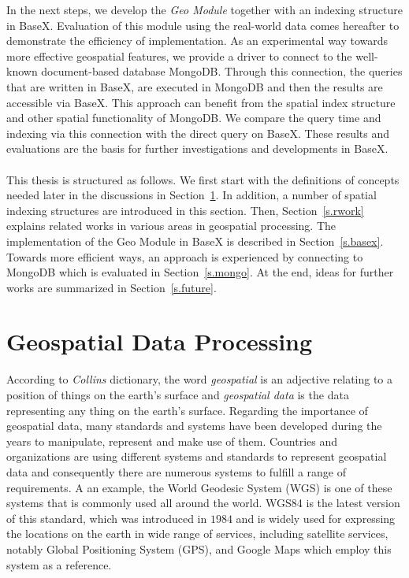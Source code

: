 \documentclass[a4paper,12pt]{article}
\begin{document}
In the next steps, we develop the \textit{Geo Module} together with an indexing structure in BaseX.
Evaluation of this module using the real-world data
comes hereafter to demonstrate the efficiency of implementation.
As an experimental way towards more effective geospatial features, 
we provide a driver to connect to the well-known document-based database MongoDB.
Through this connection, the queries that are written in BaseX, are executed in MongoDB and then the results are accessible via BaseX. This approach can benefit from the spatial index structure and other spatial functionality of MongoDB. 
We compare the query time and indexing via this connection with the direct query on BaseX. 
These results and evaluations are the basis for further investigations and developments in BaseX. 
\\\\This thesis is structured as follows. We first start with the definitions of concepts needed later in the discussions
in Section~\ref{s.method}. In addition, a number of spatial indexing structures are introduced in this section. 
Then, Section~\ref{s.rwork} explains related works in various areas in geospatial processing. The implementation of the Geo Module in BaseX is described in Section~\ref{s.basex}. 
Towards more efficient ways, an approach is experienced by connecting to MongoDB which is evaluated in Section~\ref{s.mongo}.
At the end, ideas for further works are summarized in
Section~\ref{s.future}.


\newpage
\section{Geospatial Data Processing}
\label{s.method}
According to \emph{Collins} dictionary, the word \emph{geospatial} is an adjective relating to a position of things on the earth's surface and \emph{geospatial data} is the data representing any thing on the earth's surface. Regarding the importance of geospatial data, many standards and systems have been developed  during the years to manipulate, represent and make use of them. Countries and organizations are using different systems and standards to represent geospatial data and consequently there are numerous systems to fulfill a range of requirements. A an example, the World Geodesic System (WGS) is one of these systems that is commonly used all around the world. WGS84 is the latest version of this standard, which
was introduced in $1984$ and is widely used for expressing the locations on the earth in wide range of services, including satellite services, notably Global Positioning System (GPS), and Google Maps which employ this system as a reference.
\end{document}
